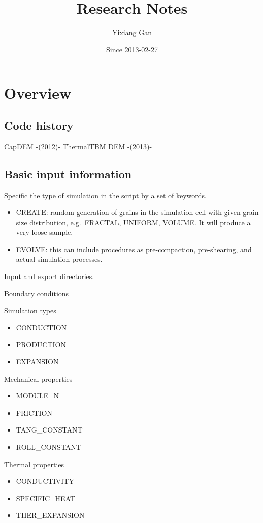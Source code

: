 \documentclass[11pt, a4paper]{report}
\title{Research Notes}
\author{Yixiang Gan}
\date{Since 2013-02-27}
\begin{document}

\chapter{Overview}

\section{Code history}

CapDEM -(2012)- ThermalTBM DEM -(2013)-

\section{Basic input information}

Specific the type of simulation in the script by a set of keywords.

\begin{itemize}\itemsep -2pt
 \item CREATE: random generation of grains in the simulation cell with given grain size distribution, e.g.\ FRACTAL, UNIFORM, VOLUME. It will produce a very loose sample.
 \item EVOLVE: this can include procedures as pre-compaction, pre-shearing, and actual simulation processes.
\end{itemize}

Input and export directories.

Boundary conditions

Simulation types
\begin{itemize} \itemsep -2pt
 \item CONDUCTION
 \item PRODUCTION
 \item EXPANSION
\end{itemize}

Mechanical properties
\begin{itemize}\itemsep -2pt
 \item MODULE\_N
 \item FRICTION 
 \item TANG\_CONSTANT
 \item ROLL\_CONSTANT
\end{itemize}

Thermal properties
\begin{itemize}\itemsep -2pt
 \item CONDUCTIVITY	
 \item SPECIFIC\_HEAT
 \item THER\_EXPANSION
\end{itemize}
\end{document}
